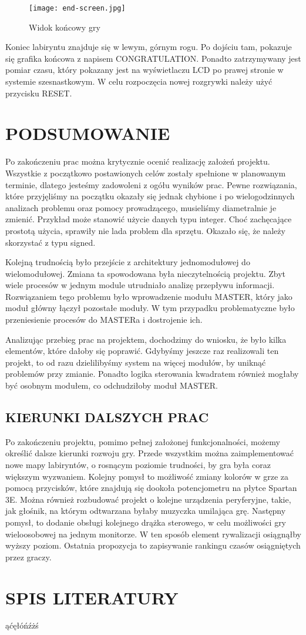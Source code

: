 \documentclass[11pt]{article}
\begin{document}
\begin{figure}[h!]
\centering
\texttt{[image: end-screen.jpg]}
\caption{Widok końcowy gry}
\end{figure}

Koniec labiryntu znajduje się w lewym, górnym rogu.
Po dojściu tam, pokazuje się grafika końcowa z napisem CONGRATULATION. %
Ponadto zatrzymywany jest pomiar czasu, który pokazany jest na wyświetlaczu LCD po prawej stronie w systemie szesnastkowym.
W celu rozpoczęcia nowej rozgrywki należy użyć przycisku RESET.





\section{PODSUMOWANIE}

Po zakończeniu prac można krytycznie ocenić realizację założeń projektu.
Wszystkie z początkowo postawionych celów zostały spełnione w planowanym terminie, dlatego jesteśmy zadowoleni z ogółu wyników prac.
Pewne rozwiązania, które przyjęliśmy na początku okazały się jednak chybione i po wielogodzinnych analizach problemu oraz pomocy prowadzącego, musieliśmy diametralnie je zmienić.
Przykład może stanowić użycie danych typu integer. Choć zachęcające prostotą użycia, sprawiły nie lada problem dla sprzętu. Okazało się, że należy skorzystać z typu signed.

Kolejną trudnością było przejście z architektury jednomodułowej do wielomodułowej.
Zmiana ta spowodowana była nieczytelnością projektu.
Zbyt wiele procesów w jednym module utrudniało analizę przepływu informacji.
Rozwiązaniem tego problemu było wprowadzenie modułu MASTER, który jako moduł główny łączył pozostałe moduły.
W tym przypadku problematyczne było przeniesienie procesów do MASTERa i dostrojenie ich.

Analizując przebieg prac na projektem, dochodzimy do wniosku, że było kilka elementów, które dałoby się poprawić.
Gdybyśmy jeszcze raz realizowali ten projekt, to od razu dzielilibyśmy system na więcej modułów, by uniknąć problemów przy zmianie.
Ponadto logika sterowania kwadratem również mogłaby być osobnym modułem, co odchudziłoby moduł MASTER.

\subsection{KIERUNKI DALSZYCH PRAC}

Po zakończeniu projektu, pomimo pełnej założonej funkcjonalności, możemy określić dalsze kierunki rozwoju gry.
Przede wszystkim można zaimplementować nowe mapy labiryntów, o rosnącym poziomie trudności, by gra była coraz większym wyzwaniem.
Kolejny pomysł to możliwość zmiany kolorów w grze za pomocą przycisków, które znajdują się dookoła potencjometru na płytce Spartan 3E.
Można również rozbudować projekt o kolejne urządzenia peryferyjne, takie, jak głośnik, na którym odtwarzana byłaby muzyczka umilająca grę.
Następny pomysł, to dodanie obsługi kolejnego drążka sterowego, w celu możliwości gry wieloosobowej na jednym monitorze.
W ten sposób element rywalizacji osiągnąłby wyższy poziom.
Ostatnia propozycja to zapisywanie rankingu czasów osiągniętych przez graczy.


\section{SPIS LITERATURY}

ąćęłóńźżś
\end{document}
